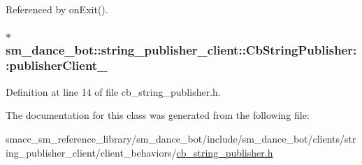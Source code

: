 Referenced by on\+Exit().

\subsubsection[{\texorpdfstring{publisher\+Client\+\_\+}{publisherClient_}}]{$\ast$ sm\+\_\+dance\+\_\+bot\+::string\+\_\+publisher\+\_\+client\+::\+Cb\+String\+Publisher\+::publisher\+Client\+\_\+}\hypertarget{classsm__dance__bot_1_1string__publisher__client_1_1CbStringPublisher_ab193cff488df923ffc0fcc1939c487f5}{}\label{classsm__dance__bot_1_1string__publisher__client_1_1CbStringPublisher_ab193cff488df923ffc0fcc1939c487f5}


Definition at line 14 of file cb\+\_\+string\+\_\+publisher.\+h.



The documentation for this class was generated from the following file\+:\begin{DoxyCompactItemize}
\item 
smacc\+\_\+sm\+\_\+reference\+\_\+library/sm\+\_\+dance\+\_\+bot/include/sm\+\_\+dance\+\_\+bot/clients/string\+\_\+publisher\+\_\+client/client\+\_\+behaviors/\hyperlink{cb__string__publisher_8h}{cb\+\_\+string\+\_\+publisher.\+h}\end{DoxyCompactItemize}
